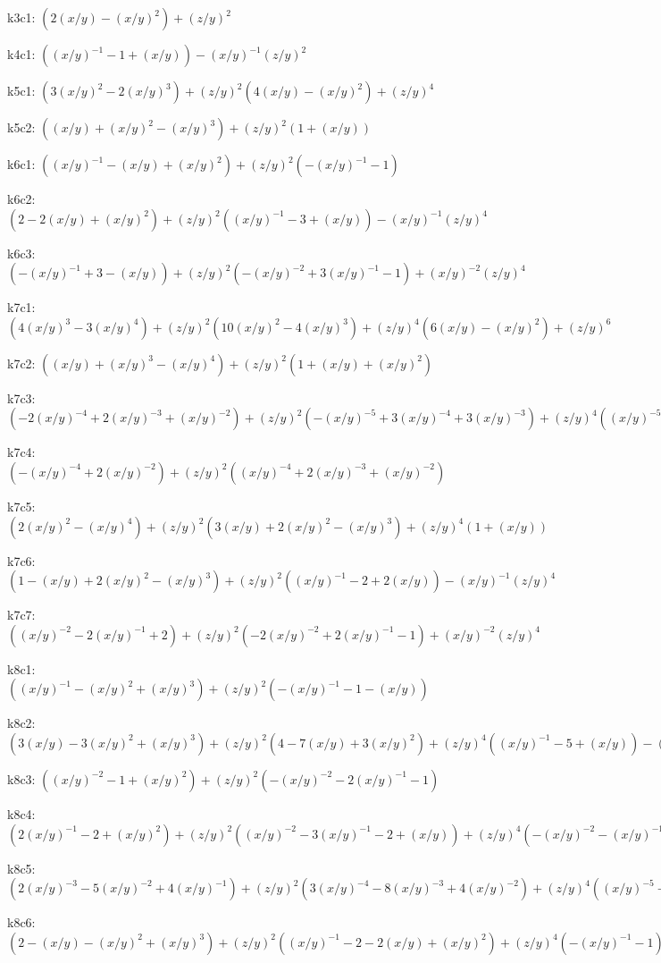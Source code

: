 k3c1: $ (2(x/y)-(x/y)^{2})  +(z/y)^{2} $ 

k4c1: $ ((x/y)^{-1}-1+(x/y))  -(x/y)^{-1}(z/y)^{2} $ 

k5c1: $ (3(x/y)^{2}-2(x/y)^{3})  +(z/y)^{2}(4(x/y)-(x/y)^{2})  +(z/y)^{4} $ 

k5c2: $ ((x/y)+(x/y)^{2}-(x/y)^{3})  +(z/y)^{2}(1+(x/y)) $ 

k6c1: $ ((x/y)^{-1}-(x/y)+(x/y)^{2})  +(z/y)^{2}(-(x/y)^{-1}-1) $ 

k6c2: $ (2-2(x/y)+(x/y)^{2})  +(z/y)^{2}((x/y)^{-1}-3+(x/y))  -(x/y)^{-1}(z/y)^{4} $ 

k6c3: $ (-(x/y)^{-1}+3-(x/y))  +(z/y)^{2}(-(x/y)^{-2}+3(x/y)^{-1}-1)  +(x/y)^{-2}(z/y)^{4} $ 

k7c1: $ (4(x/y)^{3}-3(x/y)^{4})  +(z/y)^{2}(10(x/y)^{2}-4(x/y)^{3})  +(z/y)^{4}(6(x/y)-(x/y)^{2})  +(z/y)^{6} $ 

k7c2: $ ((x/y)+(x/y)^{3}-(x/y)^{4})  +(z/y)^{2}(1+(x/y)+(x/y)^{2}) $ 

k7c3: $ (-2(x/y)^{-4}+2(x/y)^{-3}+(x/y)^{-2})  +(z/y)^{2}(-(x/y)^{-5}+3(x/y)^{-4}+3(x/y)^{-3})  +(z/y)^{4}((x/y)^{-5}+(x/y)^{-4}) $ 

k7c4: $ (-(x/y)^{-4}+2(x/y)^{-2})  +(z/y)^{2}((x/y)^{-4}+2(x/y)^{-3}+(x/y)^{-2}) $ 

k7c5: $ (2(x/y)^{2}-(x/y)^{4})  +(z/y)^{2}(3(x/y)+2(x/y)^{2}-(x/y)^{3})  +(z/y)^{4}(1+(x/y)) $ 

k7c6: $ (1-(x/y)+2(x/y)^{2}-(x/y)^{3})  +(z/y)^{2}((x/y)^{-1}-2+2(x/y))  -(x/y)^{-1}(z/y)^{4} $ 

k7c7: $ ((x/y)^{-2}-2(x/y)^{-1}+2)  +(z/y)^{2}(-2(x/y)^{-2}+2(x/y)^{-1}-1)  +(x/y)^{-2}(z/y)^{4} $ 

k8c1: $ ((x/y)^{-1}-(x/y)^{2}+(x/y)^{3})  +(z/y)^{2}(-(x/y)^{-1}-1-(x/y)) $ 

k8c2: $ (3(x/y)-3(x/y)^{2}+(x/y)^{3})  +(z/y)^{2}(4-7(x/y)+3(x/y)^{2})  +(z/y)^{4}((x/y)^{-1}-5+(x/y))  -(x/y)^{-1}(z/y)^{6} $ 

k8c3: $ ((x/y)^{-2}-1+(x/y)^{2})  +(z/y)^{2}(-(x/y)^{-2}-2(x/y)^{-1}-1) $ 

k8c4: $ (2(x/y)^{-1}-2+(x/y)^{2})  +(z/y)^{2}((x/y)^{-2}-3(x/y)^{-1}-2+(x/y))  +(z/y)^{4}(-(x/y)^{-2}-(x/y)^{-1}) $ 

k8c5: $ (2(x/y)^{-3}-5(x/y)^{-2}+4(x/y)^{-1})  +(z/y)^{2}(3(x/y)^{-4}-8(x/y)^{-3}+4(x/y)^{-2})  +(z/y)^{4}((x/y)^{-5}-5(x/y)^{-4}+(x/y)^{-3})  -(x/y)^{-5}(z/y)^{6} $ 

k8c6: $ (2-(x/y)-(x/y)^{2}+(x/y)^{3})  +(z/y)^{2}((x/y)^{-1}-2-2(x/y)+(x/y)^{2})  +(z/y)^{4}(-(x/y)^{-1}-1) $ 

